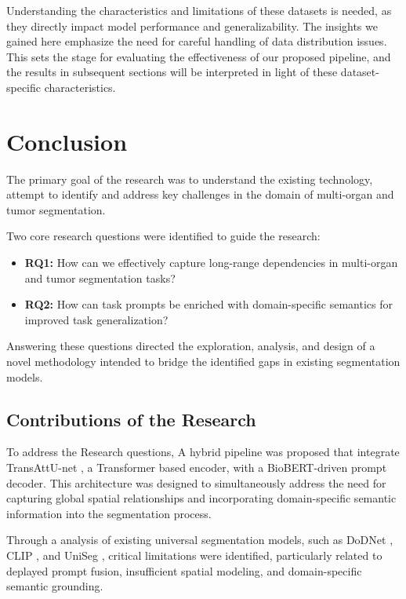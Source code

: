 \documentclass{cls/iutbscthesis}
\begin{document}
Understanding the characteristics and limitations of these datasets is needed, as they directly impact model performance and generalizability. The insights we gained here emphasize the need for careful handling of data distribution issues. This sets the stage for evaluating the effectiveness of our proposed pipeline, and the results in subsequent sections will be interpreted in light of these dataset-specific characteristics.


\chapter{Conclusion}

The primary goal of the research was to understand the existing technology, attempt to identify and address key challenges in the domain of multi-organ and tumor segmentation. 
\par
Two core research questions were identified to guide the research:
\begin{itemize}
    \item \textbf{RQ1:} How can we effectively capture long-range dependencies in multi-organ and tumor segmentation tasks?
    \item \textbf{RQ2:} How can task prompts be enriched with domain-specific semantics for improved task generalization?
\end{itemize}

Answering these questions directed the exploration, analysis, and design of a novel methodology intended to bridge the identified gaps in existing segmentation models.

\section{Contributions of the Research}

To address the Research questions, A hybrid pipeline was proposed that integrate TransAttU-net \cite{chen2024transattunet}, a Transformer based encoder, with a BioBERT-driven prompt decoder. This architecture was designed to simultaneously address the need for capturing global spatial relationships and incorporating domain-specific semantic information into the segmentation process.

\par
Through a analysis of existing universal segmentation models, such as DoDNet \cite{zhang2021dodnet}, CLIP \cite{liu2023clip}, and UniSeg \cite{ye2023uniseg}, critical limitations were identified, particularly related to deplayed prompt fusion, insufficient spatial modeling, and domain-specific semantic grounding.
\end{document}
